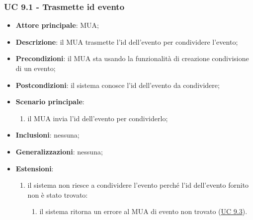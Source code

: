     \subsubsection{UC 9.1 - Trasmette id evento} \label{sec:UC9.1}
    \begin{itemize}
        \item \textbf{Attore principale}: MUA;
        \item \textbf{Descrizione}: il MUA trasmette l'id dell'evento per condividere l'evento;
        \item \textbf{Precondizioni}: il MUA sta usando la funzionalità di creazione condivisione di un evento;
        \item \textbf{Postcondizioni}: il sistema conosce l'id dell'evento da condividere;
        \item \textbf{Scenario principale}:
            \begin{enumerate}
                \item il MUA invia l'id dell'evento per condividerlo;
            \end{enumerate}
        \item \textbf{Inclusioni}: nessuna;
        \item \textbf{Generalizzazioni}: nessuna;
        \item \textbf{Estensioni}:
            \begin{enumerate}[label=\alph*.]
                \item il sistema non riesce a condividere l'evento perché l'id dell'evento fornito non è stato trovato:
                \begin{enumerate}[label=\arabic*.]
                    \item il sistema ritorna un errore al MUA di evento non trovato (\hyperref[sec:UC9.3]{UC 9.3}).
                \end{enumerate}
            \end{enumerate}
    \end{itemize}


